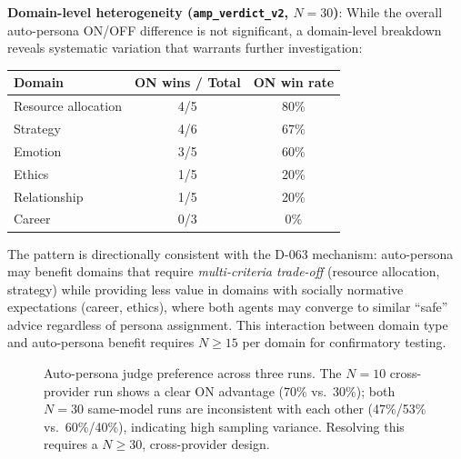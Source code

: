 \documentclass[12pt]{article}
\begin{document}
\medskip\noindent\textbf{Domain-level heterogeneity (\texttt{amp\_verdict\_v2}, $N=30$)}:
While the overall auto-persona ON/OFF difference is not significant, a domain-level
breakdown reveals systematic variation that warrants further investigation:

\begin{center}\small
\begin{tabular}{lcc}
\toprule
Domain & ON wins / Total & ON win rate \\
\midrule
Resource allocation & 4/5 & 80\% \\
Strategy & 4/6 & 67\% \\
Emotion & 3/5 & 60\% \\
Ethics & 1/5 & 20\% \\
Relationship & 1/5 & 20\% \\
Career & 0/3 & 0\% \\
\bottomrule
\end{tabular}
\end{center}
\noindent The pattern is directionally consistent with the D-063 mechanism:
auto-persona may benefit domains that require \emph{multi-criteria trade-off}
(resource allocation, strategy) while providing less value in domains with
socially normative expectations (career, ethics), where both agents may
converge to similar ``safe'' advice regardless of persona assignment.
This interaction between domain type and auto-persona benefit
requires $N\geq15$ per domain for confirmatory testing.

\begin{figure}[h!]
\centering
{}
\caption{Auto-persona judge preference across three runs. The $N=10$ cross-provider
run shows a clear ON advantage (70\% vs.\ 30\%); both $N=30$ same-model runs are
inconsistent with each other (47\%/53\% vs.\ 60\%/40\%), indicating high sampling
variance. Resolving this requires a $N\geq30$, cross-provider design.}
\label{fig:persona_ablation_runs}
\end{figure}
\end{document}
